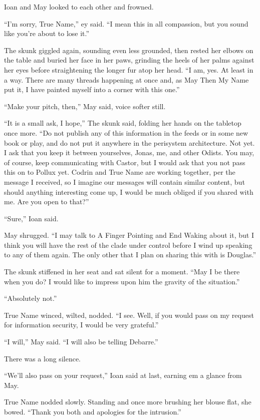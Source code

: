 Ioan and May looked to each other and frowned.

``I'm sorry, True Name,'' ey said. ``I mean this in all compassion, but you sound like you're about to lose it.''

The skunk giggled again, sounding even less grounded, then rested her elbows on the table and buried her face in her paws, grinding the heels of her palms against her eyes before straightening the longer fur atop her head. ``I am, yes. At least in a way. There are many threads happening at once and, as May Then My Name put it, I have painted myself into a corner with this one.''

``Make your pitch, then,'' May said, voice softer still.

``It is a small ask, I hope,'' The skunk said, folding her hands on the tabletop once more. ``Do not publish any of this information in the feeds or in some new book or play, and do not put it anywhere in the perisystem architecture. Not yet. I ask that you keep it between yourselves, Jonas, me, and other Odists. You may, of course, keep communicating with Castor, but I would ask that you not pass this on to Pollux yet. Codrin and True Name are working together, per the message I received, so I imagine our messages will contain similar content, but should anything interesting come up, I would be much obliged if you shared with me. Are you open to that?''

``Sure,'' Ioan said.

May shrugged. ``I may talk to A Finger Pointing and End Waking about it, but I think you will have the rest of the clade under control before I wind up speaking to any of them again. The only other that I plan on sharing this with is Douglas.''

The skunk stiffened in her seat and sat silent for a moment. ``May I be there when you do? I would like to impress upon him the gravity of the situation.''

``Absolutely not.''

True Name winced, wilted, nodded. ``I see. Well, if you would pass on my request for information security, I would be very grateful.''

``I will,'' May said. ``I will also be telling Debarre.''

There was a long silence.

``We'll also pass on your request,'' Ioan said at last, earning em a glance from May.

True Name nodded slowly. Standing and once more brushing her blouse flat, she bowed. ``Thank you both and apologies for the intrusion.''

